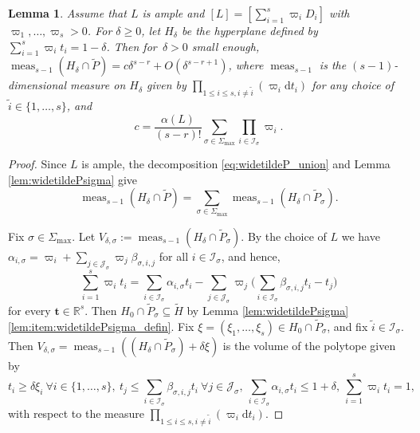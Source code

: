 \documentclass[JEP,XML,SOM,Unicode,published]{cedram}
\newcommand{\bft}{\boldsymbol{t}}
\newcommand\RR{\mathbb{R}}
\newcommand{\ii}[1]{\mathcal{J}_{#1}}
\newcommand{\ic}[1]{\mathcal{I}_{#1}}
\DeclareMathOperator{\meas}{meas}
\newtheorem{lemma}[theorem]{Lemma}
\theoremstyle{definition}
\numberwithin{theorem}{section}
\begin{document}
\begin{lemma}
\label{lem:alpha_constant}
Assume that $L$ is ample and $[L]\!=\![\sum_{i=1}^s\varpi_i D_i]$ with \hbox{$\varpi_1,\dots,\varpi_s\!>\!0$}.
For $\delta\geq0$, let $H_\delta$ be the hyperplane defined by $\sum_{i=1}^s\varpi_i t_i\!=\!1\!-\!\delta$.
Then for~\hbox{$\delta\!>\!0$} small enough,
$\meas_{s-1}(H_\delta\cap\widetilde P)= c \delta^{s-r} +O(\delta^{s-r+1})$, where
$\meas_{s-1}$ is the \hbox{$(s-1)$}\nobreakdash-dimen\-sional measure on $H_\delta$ given by
$\prod_{1\leq i\leq s, i\neq\tilde i}(\varpi_i\mathrm dt_i)$
for any choice of $\tilde i\in\{1,\dots,s\}$, and
\[
c=\frac{\alpha(L)}{(s-r)!}\sum_{\sigma\in\Sigma_{\max}}\prod_{i\in\ic{\sigma}}\varpi_i.
\]
\end{lemma}
\begin{proof}
Since $L$ is ample, the decomposition \eqref{eq:widetildeP_union}
and Lemma \ref{lem:widetildePsigma} give
\[
\meas_{s-1}(H_\delta\cap\widetilde P)
= \sum_{\sigma\in\Sigma_{\max}}\meas_{s-1}(H_\delta\cap\widetilde P_\sigma).
\]

Fix $\sigma \in\Sigma_{\max}$.
Let $V_{\delta, \sigma}:=\meas_{s-1}(H_\delta\cap\widetilde P_\sigma)$.
By the choice of $L$ we have
$\alpha_{i,\sigma}=\varpi_i+\sum_{j\in\ii{\sigma}}\varpi_j\beta_{\sigma,i,j}$ for all $i\in\ic{\sigma}$,
and hence,
\[
\sum_{i=1}^s\varpi_i t_i
=\sum_{i\in\ic{\sigma}}\alpha_{i,\sigma} t_i
-\sum_{j\in\ii{\sigma}}\varpi_j\biggl(\sum_{i\in\ic{\sigma}}\beta_{\sigma,i,j}t_i-t_j\biggr)
\]
for every $\bft \in\RR^s$.
Then $H_0\cap \widetilde P_\sigma\subseteq \widetilde H$
by Lemma \ref{lem:widetildePsigma}\eqref{lem:item:widetildePsigma_defin}.
Fix $\xi=(\xi_1,\dots,\xi_s)\in H_0\cap \widetilde P_\sigma$, and fix $\tilde i\in\ic{\sigma}$.
Then $V_{\delta,\sigma}=\meas_{s-1}((H_\delta\cap \widetilde P_\sigma)+\delta\xi)$
is the volume of the polytope given by
\[
t_i\geq \delta\xi_i \ \forall i\in\{1,\dots,s\}, \
t_{j}
\leq \sum_{i\in\ic{\sigma}} \beta_{\sigma, i,j}t_i
\ \forall j\in\ii{\sigma}, \
\sum_{i\in\ic{\sigma}} \alpha_{i,\sigma}t_i \leq 1+\delta, \ \sum_{i=1}^s\varpi_i t_i=1,
\]
with respect to the measure $\prod_{1\leq i\leq s, i\neq\tilde i}(\varpi_i\mathrm dt_i)$.


\end{proof}
\end{document}
